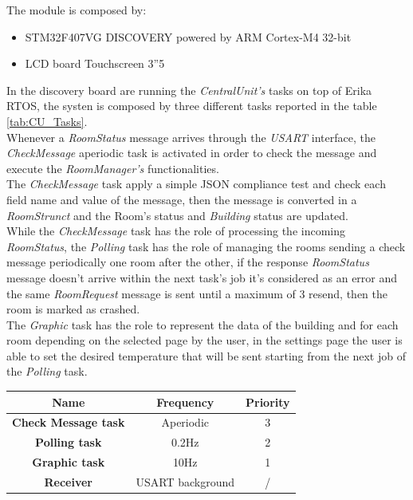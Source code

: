 The module is composed by:
\begin{itemize}
	\item STM32F407VG DISCOVERY powered by ARM Cortex-M4 32-bit
	\item LCD board Touchscreen 3”5
\end{itemize}
In the discovery board are running the \textit{CentralUnit's} tasks on top of Erika RTOS, the systen is composed by three different tasks reported in the table \ref{tab:CU_Tasks}.\\
Whenever a \textit{RoomStatus} message arrives through the \textit{USART} interface, the \textit{CheckMessage} aperiodic task is activated in order to check the message and execute the \textit{RoomManager's} functionalities.\\
The \textit{CheckMessage} task apply a simple JSON compliance test and check each field name and value of the message, then the message is converted in a \textit{RoomStrunct} and the Room's status and \textit{Building} status are updated.\\
While the \textit{CheckMessage} task has the role of processing the incoming \textit{RoomStatus}, the \textit{Polling} task has the role of managing the rooms sending a check message periodically one room after the other, 
if the response \textit{RoomStatus} message doesn't arrive within the next task's job it's considered as an error and the same \textit{RoomRequest} message is sent until a maximum of 3 resend, then the room is marked as crashed.\\
The \textit{Graphic} task has the role to represent the data of the building and for each room depending on the selected page by the user, in the settings page the user is able to set the desired temperature that will be sent starting from the next job of the \textit{Polling} task.\\
\begin{center}
	\begin{tabular}{||c | c | c ||} 
		\hline
		Name 	& Frequency & Priority	\\ 
		\hline
		\textbf{Check Message task}	&	Aperiodic		& 3 	\\ 
		\hline
		\textbf{Polling task}		&	0.2Hz			& 2 	\\ 
		\hline
		\textbf{Graphic task}		&	10Hz			& 1 	\\ 
		\hline
		\textbf{Receiver}			&	USART background		& / 	\\ 
		\hline
	\end{tabular}
\end{center}

